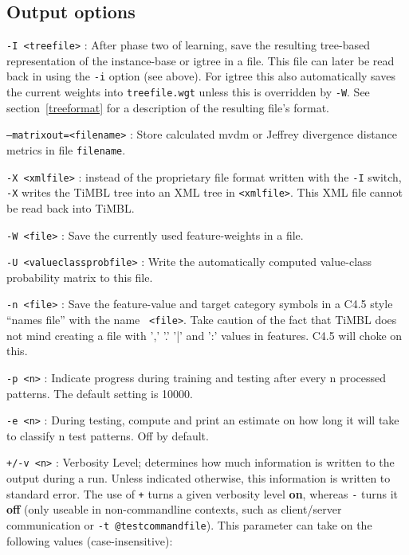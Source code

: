 \documentclass{report}
\begin{document}
\subsection{Output options}

\begin{description}

\item {\tt -I <treefile>} : After phase two of learning, save
  the resulting tree-based representation of the instance-base or {\sc
    igtree} in a file. This file can later be read back in using the
  {\tt -i} option (see above). For {\sc igtree} this also automatically
  saves the current weights into {\tt treefile.wgt} unless this is
  overridden by {\tt -W}.
  See section~\ref{treeformat} for a description of the resulting file's format.

\item {\tt --matrixout=<filename>} : Store calculated {\sc mvdm} or Jeffrey divergence distance metrics in file {\tt filename}.

\item {\tt -X <xmlfile>} : instead of the proprietary file format
  written with the {\tt -I} switch, {\tt -X} writes the TiMBL tree
  into an XML tree in {\tt <xmlfile>}. This XML file cannot be read
  back into TiMBL.

\item {\tt -W <file>} : Save the currently used feature-weights in a
file.

\item {\tt -U <valueclassprobfile>} : Write the automatically computed
value-class probability matrix to this file.

\item {\tt -n <file>} : Save the feature-value and target category
symbols in a C4.5 style ``names file'' with the name {\tt
<file>}. Take caution of the fact that TiMBL does not mind creating a
file with ',' '.' '|' and ':' values in features. C4.5 will choke on this.

\item {\tt -p <n>} : Indicate progress during training and testing
after every n processed patterns. The default setting is 10000.

\item {\tt -e <n>} : During testing, compute and print an estimate on
how long it will take to classify n test patterns. Off by
default.

\item {\tt +/-v <n>} : Verbosity Level; determines how much
information is written to the output during a run. Unless indicated
otherwise, this information is written to standard error. The use of
{\tt +} turns a given verbosity level {\bf on}, whereas {\tt -} turns
it {\bf off} (only useable in non-commandline contexts, such as
client/server communication or {\tt -t @testcommandfile}). This
parameter can take on the following values (case-insensitive):


\end{description}
\end{document}
